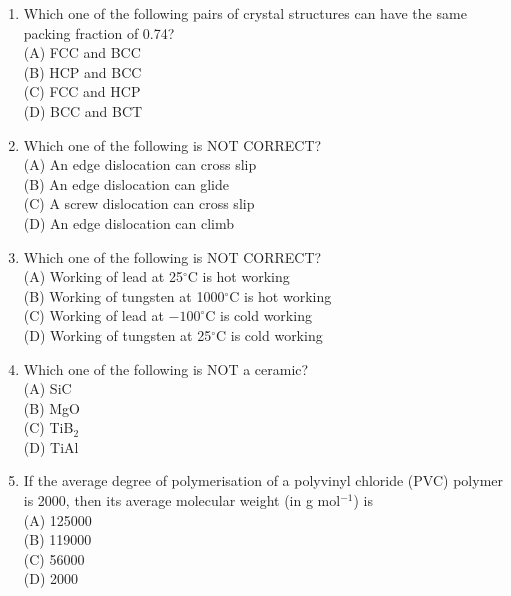 \documentclass[journal,12pt,onecolumn]{IEEEtran}
\begin{document}
\begin{enumerate}

\item Which one of the following pairs of crystal structures can have the same packing fraction of 0.74?
\vspace{0.2cm}
\hfill{}\\
(A) FCC and BCC \\
(B) HCP and BCC \\
(C) FCC and HCP \\
(D) BCC and BCT
\vspace{0.5cm}

\item Which one of the following is NOT CORRECT?
\vspace{0.2cm}
\hfill{}\\
(A) An edge dislocation can cross slip \\
(B) An edge dislocation can glide \\
(C) A screw dislocation can cross slip \\
(D) An edge dislocation can climb
\vspace{0.5cm}

\item Which one of the following is NOT CORRECT?
\vspace{0.2cm}
\hfill{}\\
(A) Working of lead at 25$^\circ$C is hot working \\
(B) Working of tungsten at 1000$^\circ$C is hot working \\
(C) Working of lead at $-100^\circ$C is cold working \\
(D) Working of tungsten at 25$^\circ$C is cold working
\vspace{0.5cm}

\item Which one of the following is NOT a ceramic?
\vspace{0.2cm}
\hfill{}\\
(A) SiC \\
(B) MgO \\
(C) TiB$_2$ \\
(D) TiAl
\vspace{0.5cm}

\item If the average degree of polymerisation of a polyvinyl chloride (PVC) polymer is 2000, then its average molecular weight (in g mol$^{-1}$) is
\vspace{0.2cm}
\hfill{}\\
(A) 125000 \\
(B) 119000 \\
(C) 56000 \\
(D) 2000
\vspace{0.5cm}


\end{enumerate}
\end{document}
